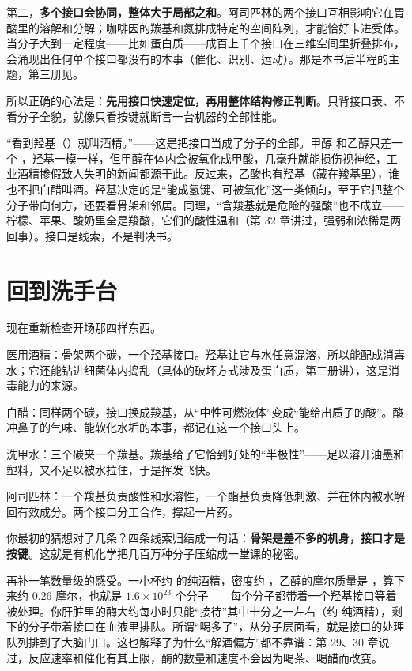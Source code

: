 第二，\textbf{多个接口会协同，整体大于局部之和}。阿司匹林的两个接口互相影响它在胃酸里的溶解和分解；咖啡因的羰基和氮排成特定的空间阵列，才能恰好卡进受体。当分子大到一定程度——比如蛋白质——成百上千个接口在三维空间里折叠排布，会涌现出任何单个接口都没有的本事（催化、识别、运动）。那是本书后半程的主题，第三册见。

所以正确的心法是：\textbf{先用接口快速定位，再用整体结构修正判断}。只背接口表、不看分子全貌，就像只看按键就断言一台机器的全部性能。

\begin{wuqu}
“看到羟基（）就叫酒精。”——这是把接口当成了分子的全部。甲醇  和乙醇只差一个 ，羟基一模一样，但甲醇在体内会被氧化成甲酸，几毫升就能损伤视神经，工业酒精掺假致人失明的新闻都源于此。反过来，乙酸也有羟基（藏在羧基里），谁也不把白醋叫酒。羟基决定的是“能成氢键、可被氧化”这一类倾向，至于它把整个分子带向何方，还要看骨架和邻居。同理，“含羧基就是危险的强酸”也不成立——柠檬、苹果、酸奶里全是羧酸，它们的酸性温和（第 32 章讲过，强弱和浓稀是两回事）。接口是线索，不是判决书。
\end{wuqu}

\section{回到洗手台}

现在重新检查开场那四样东西。

医用酒精：骨架两个碳，一个羟基接口。羟基让它与水任意混溶，所以能配成消毒水；它还能钻进细菌体内捣乱（具体的破坏方式涉及蛋白质，第三册讲），这是消毒能力的来源。

白醋：同样两个碳，接口换成羧基，从“中性可燃液体”变成“能给出质子的酸”。酸冲鼻子的气味、能软化水垢的本事，都记在这一个接口头上。

洗甲水：三个碳夹一个羰基。羰基给了它恰到好处的“半极性”——足以溶开油墨和塑料，又不足以被水拉住，于是挥发飞快。

阿司匹林：一个羧基负责酸性和水溶性，一个酯基负责降低刺激、并在体内被水解回有效成分。两个接口分工合作，撑起一片药。

你最初的猜想对了几条？四条线索归结成一句话：\textbf{骨架是差不多的机身，接口才是按键}。这就是有机化学把几百万种分子压缩成一堂课的秘密。

再补一笔数量级的感受。一小杯约  的纯酒精，密度约 ，乙醇的摩尔质量是 ，算下来约 $0.26$ 摩尔，也就是 $1.6\times 10^{23}$ 个分子——每个分子都带着一个羟基接口等着被处理。你肝脏里的酶大约每小时只能“接待”其中十分之一左右（约  纯酒精），剩下的分子带着接口在血液里排队。所谓“喝多了”，从分子层面看，就是接口的处理队列排到了大脑门口。这也解释了为什么“解酒偏方”都不靠谱：第 29、30 章说过，反应速率和催化有其上限，酶的数量和速度不会因为喝茶、喝醋而改变。


